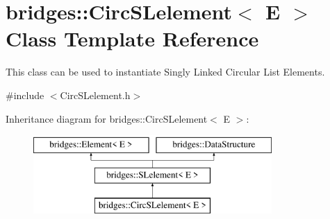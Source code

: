 \hypertarget{classbridges_1_1_circ_s_lelement}{}\section{bridges\+::Circ\+S\+Lelement$<$ E $>$ Class Template Reference}
\label{classbridges_1_1_circ_s_lelement}


This class can be used to instantiate Singly Linked Circular List Elements.  




{\ttfamily \#include $<$Circ\+S\+Lelement.\+h$>$}

Inheritance diagram for bridges\+::Circ\+S\+Lelement$<$ E $>$\+:\begin{figure}[H]
\begin{center}
\leavevmode
\includegraphics[height=3.000000cm]{classbridges_1_1_circ_s_lelement}
\end{center}
\end{figure}
